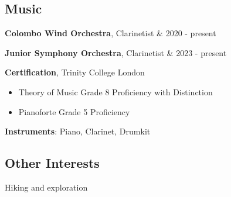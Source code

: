\documentclass[10pt, a4paper]{article}
\newenvironment{highlights}{
        \begin{itemize}[
                topsep=0pt,
                parsep=0.10 cm,
                partopsep=0pt,
                itemsep=0pt,
                after=\vspace{-1\baselineskip},
                leftmargin=0.4 cm + 3pt
            ]
    }{
        \end{itemize}
    } %
\let\originalTabularx\tabularx
\let\originalEndTabularx\endtabularx
\renewenvironment{tabularx}{\bgroup\centering\originalTabularx}{\originalEndTabularx\par\egroup}
\begin{document}
\subsection{Music}
	\begin{tabularx}{\textwidth-0.4 cm-0.13cm}{K{0.2 cm} R{4.1 cm}}
            \textbf{Colombo Wind Orchestra}, Clarinetist
            &
            2020 - present
     \end{tabularx}
     \vspace{0.2 cm}
	\begin{tabularx}{\textwidth-0.4 cm-0.13cm}{K{0.2 cm} R{4.1 cm}}
            \textbf{Junior Symphony Orchestra}, Clarinetist
            &
            2023 - present
     \end{tabularx}
     
     \vspace{0.2 cm}
	\textbf{Certification}, Trinity College London
			\begin{highlights}
	       	 \item Theory of Music Grade 8 Proficiency with Distinction
			\item Pianoforte Grade 5 Proficiency
	        \end{highlights}
    \vspace{0.6 cm}
     \textbf{Instruments}: Piano, Clarinet, Drumkit
\subsection{Other Interests}
     Hiking and exploration
\end{document}
